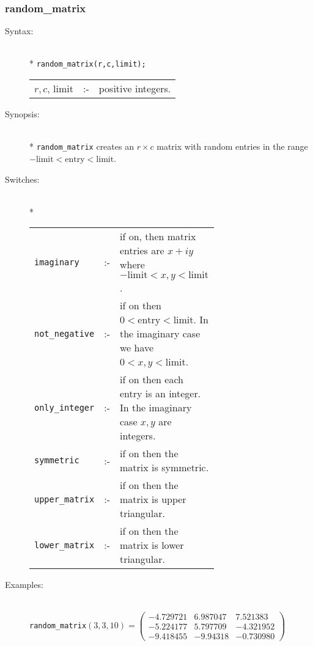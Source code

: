 \subsubsection{random\_matrix}
\label{linalg:random_matrix}
\hypertarget{operator:RANDOM_MATRIX}{}

\begin{description}
\item[Syntax:]\mbox{}\\*
\texttt{random\_matrix(r,c,limit);}\\[2mm]
\begin{tabular}{l l l}
$r,c$, limit &:-& positive integers. \\
\end{tabular}

\item[Synopsis:]\mbox{}\\*
\texttt{random\_matrix} creates an $r\times c$ matrix with random entries in the
range $-\text{limit} < \text{entry} < \text{limit}$.

\hypertarget{switch:IMAGINARY}{}
\hypertarget{switch:NOT_NEGATIVE}{}
\hypertarget{switch:ONLY_INTEGER}{}
\hypertarget{switch:SYMMETRIC}{}
\hypertarget{switch:LOWER_MATRIX}{}
\hypertarget{switch:UPPER_MATRIX}{}
\item[Switches:]\mbox{}\\*
\begin{tabular}{l l p{0.65\linewidth}}
\texttt{imaginary}  &:-& if
on, then matrix entries are $x+iy$ where $-\text{limit} < x,y < \text{limit}$.\\
\texttt{not\_negative} &:-& if on then $0 <
\text{entry} < \text{limit}$. In the imaginary case we have $0<x,y<\text{limit}$.\\
\texttt{only\_integer} &:-& if on then each
entry is an integer. In the imaginary case $x,y$ are integers.\\
\texttt{symmetric} &:-& if on then the matrix is symmetric. \\
\texttt{upper\_matrix} &:-& if on then the
matrix is upper triangular. \\
\texttt{lower\_matrix} &:-& if on then the matrix is lower triangular.
\end{tabular}

\item[Examples:]\mbox{}\\
  \texttt{random\_matrix}\((3,3,10) =
  \begin{pmatrix} -4.729721 & 6.987047 & 7.521383 \\
    - 5.224177 & 5.797709 & - 4.321952 \\
    - 9.418455 & - 9.94318 & - 0.730980
  \end{pmatrix}\)


\end{description}
